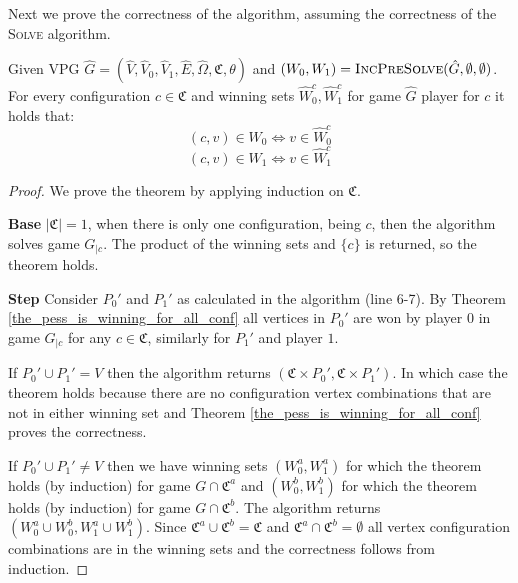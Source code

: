 Next we prove the correctness of the algorithm, assuming the correctness of the \textsc{Solve} algorithm.
\begin{theorem}
	Given VPG $\hat{G} = (\hat{V},\hat{V}_0,\hat{V}_1,\hat{E},\hat{\Omega},\mathfrak{C},\theta)$ and $(W_0,W_1) = \textsc{IncPreSolve}(\hat{G},\emptyset,\emptyset)$. For every configuration $c \in \mathfrak{C}$ and winning sets $\hat{W}_0^c, \hat{W}_1^c$ for game $\hat{G}$ player for $c$ it holds that:
	\[ (c,v) \in W_0 \iff v \in \hat{W}_0^c \]
	\[ (c,v) \in W_1 \iff v \in \hat{W}_1^c \]
	\begin{proof}
		We prove the theorem by applying induction on $\mathfrak{C}$.
		
		\textbf{Base} $|\mathfrak{C}| = 1$, when there is only one configuration, being $c$, then the algorithm solves game $G_{|c}$. The product of the winning sets and $\{c\}$ is returned, so the theorem holds.
		
		\textbf{Step} Consider $P_0'$ and $P_1'$ as calculated in the algorithm (line 6-7). By Theorem \ref{the_pess_is_winning_for_all_conf} all vertices in $P_0'$ are won by player $0$ in game $G_{|c}$ for any $c \in \mathfrak{C}$, similarly for $P_1'$ and player $1$.
		
		If $P_0' \cup P_1' = V$ then the algorithm returns $(\mathfrak{C} \times P_0',\mathfrak{C} \times P_1')$. In which case the theorem holds because there are no configuration vertex combinations that are not in either winning set and Theorem \ref{the_pess_is_winning_for_all_conf} proves the correctness.
		
		If $P_0' \cup P_1' \neq V$ then we have winning sets $(W_0^a, W_1^a)$ for which the theorem holds (by induction) for game $G \cap \mathfrak{C}^a$ and $(W_0^b, W_1^b)$ for which the theorem holds (by induction) for game $G \cap \mathfrak{C}^b$. The algorithm returns $(W_0^a \cup W_0^b, W_1^a \cup W_1^b)$. Since $\mathfrak{C}^a \cup \mathfrak{C}^b = \mathfrak{C}$ and $\mathfrak{C}^a \cap \mathfrak{C}^b = \emptyset$ all vertex configuration combinations are in the winning sets and the correctness follows from induction.
	\end{proof}
\end{theorem}

